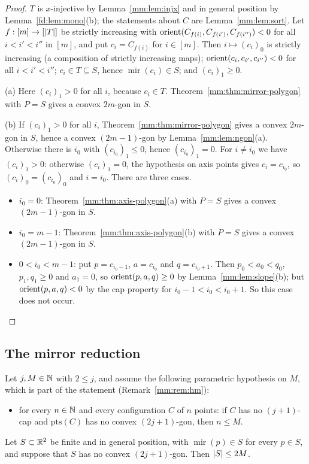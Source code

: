 \begin{proof}
$T$ is $x$-injective by Lemma~\ref{mm:lem:injx} and in general position by Lemma~\ref{fd:lem:mono}(b); the
statements about $C$ are Lemma~\ref{mm:lem:sort}. Let $f:[m]\to[\lvert T\rvert]$ be strictly increasing with
$\operatorname{orient}(C_{f(i)},C_{f(i')},C_{f(i'')})<0$ for all $i<i'<i''$ in $[m]$, and put $c_i=C_{f(i)}$ for
$i\in[m]$. Then $i\mapsto(c_i)_0$ is strictly increasing (a composition of strictly increasing maps);
$\operatorname{orient}(c_i,c_{i'},c_{i''})<0$ for all $i<i'<i''$; $c_i\in T\subseteq S$, hence
$\operatorname{mir}(c_i)\in S$; and $(c_i)_1\ge0$.

(a) Here $(c_i)_1>0$ for all $i$, because $c_i\in T$. Theorem~\ref{mm:thm:mirror-polygon} with $P=S$ gives
a convex $2m$-gon in $S$.

(b) If $(c_i)_1>0$ for all $i$, Theorem~\ref{mm:thm:mirror-polygon} gives a convex $2m$-gon in $S$, hence a
convex $(2m-1)$-gon by Lemma~\ref{mm:lem:ngon}(a). Otherwise there is $i_0$ with $(c_{i_0})_1\le0$, hence
$(c_{i_0})_1=0$. For $i\ne i_0$ we have $(c_i)_1>0$: otherwise $(c_i)_1=0$, the hypothesis on axis points
gives $c_i=c_{i_0}$, so $(c_i)_0=(c_{i_0})_0$ and $i=i_0$. There are three cases.
\begin{itemize}
\item $i_0=0$: Theorem~\ref{mm:thm:axis-polygon}(a) with $P=S$ gives a convex $(2m-1)$-gon in $S$.
\item $i_0=m-1$: Theorem~\ref{mm:thm:axis-polygon}(b) with $P=S$ gives a convex $(2m-1)$-gon in $S$.
\item $0<i_0<m-1$: put $p=c_{i_0-1}$, $a=c_{i_0}$ and $q=c_{i_0+1}$. Then $p_0<a_0<q_0$, $p_1,q_1\ge0$ and
  $a_1=0$, so $\operatorname{orient}(p,a,q)\ge0$ by Lemma~\ref{mm:lem:slope}(b); but $\operatorname{orient}(p,a,q)<0$ by the cap
  property for $i_0-1<i_0<i_0+1$. So this case does not occur. \qedhere
\end{itemize}
\end{proof}

\subsection{The mirror reduction}

\begin{theorem}\label{mm:thm:odd}
Let $j,M\in\mathbb N$ with $2\le j$, and assume the following parametric hypothesis on $M$, which is part of the
statement (Remark~\ref{mm:rem:hm}):
\begin{itemize}
\item[(hM)] for every $n\in\mathbb N$ and every configuration $C$ of $n$ points: if $C$ has no $(j+1)$-cap and
  $\mathrm{pts}(C)$ has no convex $(2j+1)$-gon, then $n\le M$.
\end{itemize}
Let $S\subset\mathbb R^2$ be finite and in general position, with $\operatorname{mir}(p)\in S$ for every $p\in S$,
and suppose that $S$ has no convex $(2j+1)$-gon. Then $\lvert S\rvert\le2M$.
\end{theorem}

